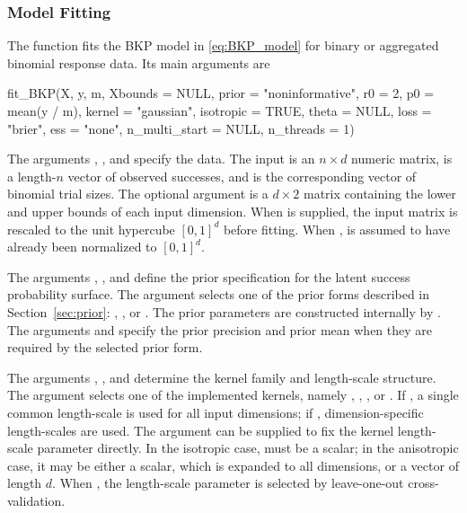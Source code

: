 \documentclass[article, shortnames]{jss}
\newcommand{\fct}[1]{\code{#1()}}
\begin{document}
\subsubsection{Model Fitting}

The function \fct{fit\_BKP} fits the BKP model in \eqref{eq:BKP_model} for binary or aggregated binomial response data. Its main arguments are
\begin{Code}
fit_BKP(X, y, m, Xbounds = NULL,
	prior = "noninformative", r0 = 2, p0 = mean(y / m),
	kernel = "gaussian", isotropic = TRUE, theta = NULL,
	loss = "brier", ess = "none", n_multi_start = NULL, n_threads = 1)
\end{Code}

The arguments , , and  specify the data. The input  is an $n \times d$ numeric matrix,  is a length-$n$ vector of observed successes, and  is the corresponding vector of binomial trial sizes. The optional argument  is a $d \times 2$ matrix containing the lower and upper bounds of each input dimension. When  is supplied, the input matrix is rescaled to the unit hypercube $[0,1]^d$ before fitting. When ,  is assumed to have already been normalized to $[0,1]^d$.

The arguments , , and  define the prior specification for the latent success probability surface. The argument  selects one of the prior forms described in Section~\ref{sec:prior}: , , or . The prior parameters are constructed internally by \fct{get\_prior}. The arguments  and  specify the prior precision and prior mean when they are required by the selected prior form.

The arguments , , and  determine the kernel family and length-scale structure. The argument  selects one of the implemented kernels, namely , , , or . If , a single common length-scale is used for all input dimensions; if , dimension-specific length-scales are used. The argument  can be supplied to fix the kernel length-scale parameter directly. In the isotropic case,  must be a scalar; in the anisotropic case, it may be either a scalar, which is expanded to all dimensions, or a vector of length $d$. When , the length-scale parameter is selected by leave-one-out cross-validation.
\end{document}
